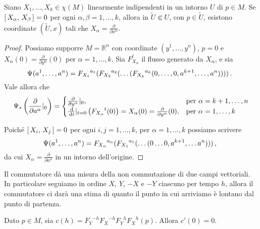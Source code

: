 \begin{proposition}
	Siano $X_1,\dots ,X_k\in \chi(M)$ linearmente indipendenti in un intorno $U$ di $p\in M$. Se $\left[\,X_\alpha,\,X_\beta\,\right]=0$ per ogni $\alpha,\beta=1,\ldots ,k$, allora in $\tilde{U}\Subset U$, con $p\in \tilde{U}$, esistono coordinate $(\tilde{U},x)$ tali che $X_\alpha=\frac{\partial}{\partial x^{\alpha}}$.
\end{proposition}

\begin{proof}
	Possiamo supporre $M=\mathbb{R}^n$ con coordinate $(y^1,\dots, y^n)$, $p=0$ e $X_\alpha(0)=\frac{\partial}{\partial y^\alpha}(0)$ per $\alpha=1,\dots, k$. Sia $F_{X_\alpha}^t$ il flusso generato da $X_\alpha$, e sia 
	\begin{equation*}
		\Psi(a^1,\dots, a^n)={F_{X_1}}^{a_1}({F_{X_2}}^{a_2}(\dots ({F_{X_k}}^{a_k}(0,\dots,0,a^{k+1},\dots, a^n))))\, \text{. } 
	\end{equation*}
	Vale allora che
	\begin{equation*}
		\Psi_*\left(\frac{\partial}{\partial a^\alpha}|_{0}\right) = 
		\begin{cases}
			\frac{\partial}{\partial y^\alpha}|_{0}, &\text{per $\alpha=k+1,\dots,n$}\\
			\frac{\,\mathrm d}{\,\mathrm d t}|_{t=0}\left({F_{X_\alpha}}^t(0)\right) = X_\alpha(0)=\frac{\partial}{\partial y^{\alpha}}(0), &\text{per $\alpha=1,\dots,k$}
		\end{cases}
	\end{equation*}
	
	Poiché $\left[\,X_i,\,X_j\,\right]=0$ per ogni $i,j=1,\dots,k$, per $\alpha=1,\dots, k$ possiamo scrivere
	\begin{equation*}
		\Psi(a^1,\dots,a^n)={F_{X_\alpha}}^{a_\alpha}({F_{X_1}}^{a_1}(\dots (0\dots 0, a^{k+1},\dots a^n)))\, \text{, }
	\end{equation*}
	da cui $X_{\alpha}=\frac{\partial}{\partial a^{\alpha}}$ in un intorno dell'origine.
\end{proof}

Il commutatore dà una misura della non commutazione di due campi vettoriali. In particolare seguiamo in ordine $X$, $Y$, $-X$ e $-Y$ ciascuno per tempo $h$, allora il commutatore ci darà una stima di quanto il punto in cui arriviamo è lontano dal punto di partenza.

\begin{proposition}
	Dato $p\in M$, sia $c(h)={F_Y}^{-h}{F_X}^{-h}{F_Y}^h{F_X}^h(p)$. Allora $c'(0)=0$.
\end{proposition}


